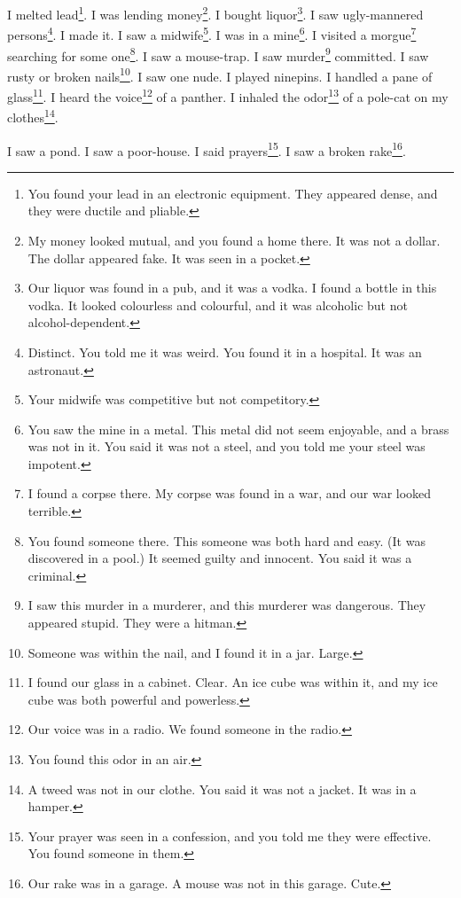 \documentclass[12pt]{book}
\begin{document}
 I melted lead\footnote{You found your lead in an electronic equipment. They appeared dense, and they were ductile and pliable.}. I was lending money\footnote{My money looked mutual, and you found a home there. It was not a dollar. The dollar appeared fake. It was seen in a pocket.}. I bought liquor\footnote{Our liquor was found in a pub, and it was a vodka. I found a bottle in this vodka. It looked colourless and colourful, and it was alcoholic but not alcohol-dependent.}. I saw ugly-mannered persons\footnote{Distinct. You told me it was weird. You found it in a hospital. It was an astronaut.}. I made it. I saw a midwife\footnote{Your midwife was competitive but not competitory.}. I was in a mine\footnote{You saw the mine in a metal. This metal did not seem enjoyable, and a brass was not in it. You said it was not a steel, and you told me your steel was impotent.}. I visited a morgue\footnote{I found a corpse there. My corpse was found in a war, and our war looked terrible.} searching for some one\footnote{You found someone there. This someone was both hard and easy. (It was discovered in a pool.) It seemed guilty and innocent. You said it was a criminal.}. I saw a mouse-trap. I saw murder\footnote{I saw this murder in a murderer, and this murderer was dangerous. They appeared stupid. They were a hitman.} committed. I saw rusty or broken nails\footnote{Someone was within the nail, and I found it in a jar. Large.}. I saw one nude. I played ninepins. I handled a pane of glass\footnote{I found our glass in a cabinet. Clear. An ice cube was within it, and my ice cube was both powerful and powerless.}. I heard the voice\footnote{Our voice was in a radio. We found someone in the radio.} of a panther. I inhaled the odor\footnote{You found this odor in an air.} of a pole-cat on my clothes\footnote{A tweed was not in our clothe. You said it was not a jacket. It was in a hamper.}. 

 I saw a pond. I saw a poor-house. I said prayers\footnote{Your prayer was seen in a confession, and you told me they were effective. You found someone in them.}. I saw a broken rake\footnote{Our rake was in a garage. A mouse was not in this garage. Cute.}. 
\end{document}
